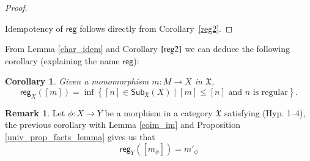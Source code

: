 \documentclass[12pt]{article}
\newtheorem{corollary}[lemma]{Corollary}
\theoremstyle{definition}
\newtheorem{remark}[lemma]{Remark}
\def\X{\mathfrak X}
\numberwithin{equation}{section}
\newcommand{\catname}[1]{\mathbf{#1}}
\newcommand{\im}[1]{\mathrm{Im}(#1)}
\newcommand{\sub}[1]{\mathsf{Sub}_{\catname{#1}}}
\def\reg{\mathsf{reg}}
\newcommand{\rg}[2]{\mathsf{reg}_{#1}([#2])}
\begin{document}
\begin{proof}
\begin{enumerate}[\rm {(CO.}1)]
\end{enumerate}
Idempotency of $\reg$ follows directly from Corollary~\ref{reg2}.
\end{proof}

From Lemma \ref{char_idem} and Corollary $\ref{reg2}$ we can deduce the following corollary (explaining the name $\mathsf{reg}$):

\begin{corollary}\label{supinf} 
Given a monomorphism $m\colon M\to X$ in $\X$,
\begin{equation*} 
\rg{X}{m}=\inf\left\{[n]\in \sub{\X}(X) \mid [m]\leq [n] \text{ and } n \text{ is regular}\right\}.
\end{equation*}
\end{corollary}

\begin{remark}\label{clos_coim}Let $\phi:X\rightarrow Y$ be a morphism in a category $\X$ satisfying (Hyp. 1--4), the previous corollary with Lemma \ref{coim_im} and Proposition \ref{univ_prop_facts_lemma} gives us that 
	\[\reg_Y([m_\phi])=m'_\phi\]
\end{remark}
\end{document}
